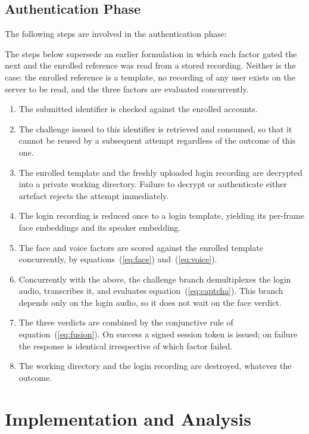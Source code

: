 \documentclass[10pt,journal,compsoc]{IEEEtran}
\begin{document}
\subsection{Authentication Phase}
The following steps are involved in the authentication phase:
{\color{blue}
\noindent The steps below supersede an earlier formulation in which each factor gated the next and the enrolled reference was read from a stored recording. Neither is the case: the enrolled reference is a template, no recording of any user exists on the server to be read, and the three factors are evaluated concurrently.
\begin{enumerate}
\item The submitted identifier is checked against the enrolled accounts.
\item The challenge issued to this identifier is retrieved and consumed, so that it cannot be reused by a subsequent attempt regardless of the outcome of this one.
\item The enrolled template and the freshly uploaded login recording are decrypted into a private working directory. Failure to decrypt or authenticate either artefact rejects the attempt immediately.
\item The login recording is reduced once to a login template, yielding its per-frame face embeddings and its speaker embedding.
\item The face and voice factors are scored against the enrolled template concurrently, by equations~(\ref{eq:face}) and~(\ref{eq:voice}).
\item Concurrently with the above, the challenge branch demultiplexes the login audio, transcribes it, and evaluates equation~(\ref{eq:captcha}). This branch depends only on the login audio, so it does not wait on the face verdict.
\item The three verdicts are combined by the conjunctive rule of equation~(\ref{eq:fusion}). On success a signed session token is issued; on failure the response is identical irrespective of which factor failed.
\item The working directory and the login recording are destroyed, whatever the outcome.
\end{enumerate}
}
\renewcommand{\algorithmicrequire}{\textbf{Input:}}
\renewcommand{\algorithmicensure}{\textbf{Output:}}


\section{Implementation and Analysis}
\end{document}
